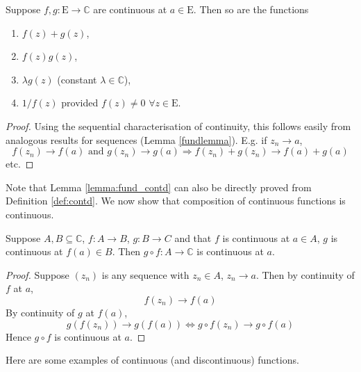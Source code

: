 \documentclass[10pt, a4paper, twoside]{report}
\begin{document}
\begin{lemma}
    Suppose \(f,g:\mathrm{E}\to\mathbb{C}\) are continuous at \(a\in\mathrm{E}\). Then so are the functions
    \begin{enumerate}
        \item \(f(z)+g(z)\),
        \item \(f(z)g(z)\),
        \item \(\lambda g(z)\) \space (constant \(\lambda\in\mathbb{C}\)),
        \item \(1/f(z)\) \space provided \(f(z)\neq 0\) \(\forall z\in\mathrm{E}\).
    \end{enumerate}
    \label{lemma:fund_contd}
\end{lemma}
\begin{proof}
    Using the sequential characterisation of continuity, this follows easily from analogous results for sequences (Lemma \ref{fundlemma}). E.g. if \(z_n\to a\),
    \[f(z_n)\to f(a)\text{  and  }g(z_n)\to g(a)\Rightarrow f(z_n)+g(z_n)\to f(a)+g(a)\]
    etc.
\end{proof}
Note that Lemma \ref{lemma:fund_contd} can also be directly proved from Definition \ref{def:contd}. We now show that composition of continuous functions is continuous.
\begin{theorem}
    Suppose \(A,B\subseteq\mathbb{C}\), \(f:A\to B\), \(g:B\to C\) and that \(f\) is continuous at \(a\in A\), \(g\) is continuous at \(f(a)\in B\). Then \(g\circ f:A\to\mathbb{C}\) is continuous at \(a\).
    \label{thm:comp_contd}
\end{theorem}
\begin{proof}
    Suppose \((z_n)\) is any sequence with \(z_n\in A\), \(z_n\to a\). Then by continuity of \(f\) at \(a\),
    \[f(z_n)\to f(a)\]
    By continuity of \(g\) at \(f(a)\),
    \[g(f(z_n))\to g(f(a))\Leftrightarrow g\circ f(z_n)\to g\circ f(a)\]
    Hence \(g\circ f\) is continuous at \(a\).
\end{proof}
Here are some examples of continuous (and discontinuous) functions.
\end{document}
